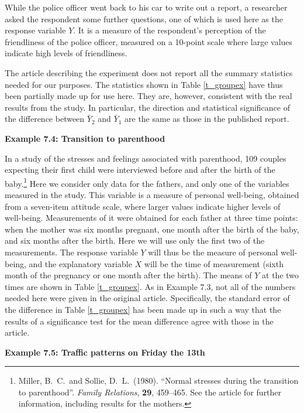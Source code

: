While the police officer went back to his car to write out a report, a
researcher asked the respondent some further
questions, one of which is used here as the response variable $Y$. It
is a measure of the respondent's perception of the friendliness of the
police officer, measured on a 10-point scale where large values indicate
high levels of friendliness.

The article describing the experiment does not report all the summary
statistics needed for our purposes. The statistics shown
in Table \ref{t_groupex} have thus been partially made up for use here. They are,
however, consistent with the real results from the study. In particular,
the direction and statistical significance of the difference between
$\bar{Y}_{2}$ and $\bar{Y}_{1}$ are the same as those in the published
report.

\newpage
\label{p_dependentex}
\textbf{Example 7.4: Transition to parenthood}

In a study of the stresses and feelings associated with parenthood, 109
couples expecting their first child were interviewed before and after the
birth of the baby.\footnote{Miller, B.\ C.\ and Sollie, D.\ L.\ (1980).
``Normal stresses during the transition to parenthood''. \emph{Family
Relations}, \textbf{29}, 459--465. See the article for further
information, including results for the mothers.} Here we consider only
data for the fathers, and only one of the variables measured in the
study. This variable is a measure of personal well-being, obtained from
a seven-item attitude scale, where larger values indicate higher levels
of well-being.
Measurements of it were obtained for each
father at three time points: when the mother was six months pregnant,
one month after the birth of the baby, and six months after the birth.
Here we will use only the first two of the measurements. The response
variable $Y$ will thus be the measure of personal well-being, and the
explanatory variable $X$ will be the time of measurement (sixth month of
the pregnancy or one month after the birth). The means of $Y$ at the two
times are shown in Table \ref{t_groupex}. As in Example 7.3, not all of
the numbers needed here were given in the original article.
Specifically, the standard error of the difference in Table
\ref{t_groupex} has been made up in such a way that the results of a
significance test for the mean difference agree with those in the article.

\textbf{Example 7.5: Traffic patterns on Friday the 13th}

